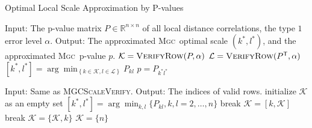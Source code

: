 \documentclass[11pt]{article}
\providecommand{\sct}[1]{{\normalfont\textsc{#1}}}
\newcommand{\Real}{\mathbb{R}}
\newcommand{\K}{\mathcal{K}}
\newcommand{\LL}{\mathcal{L}}
\newcommand{\T}{^{\ensuremath{\mathsf{T}}}}           %
\newcommand{\Mgc}{\sct{Mgc}}
\begin{document}
\begin{algorithm}
\caption{Optimal Local Scale Approximation by P-values}
\label{alg:best_scale}
\begin{algorithmic}[1]
\Statex Input: The p-value matrix $P \in \Real^{n \times n}$ of all local distance correlations, the type $1$ error level $\alpha$.
\Statex Output: The approximated \Mgc~optimal scale $(k^{*},l^{*})$, and the approximated \Mgc~p-value $p$.
\State $\K=\textsc{VerifyRow}(P,\alpha)$ 
\State $\LL=\textsc{VerifyRow}(P\T,\alpha)$ 
\State $[k^{*},l^{*}]=\arg\min_{\left\{k \in \K, l \in \LL\right\}} P_{kl}$ 
\State $p=P_{k^{*}l^{*}}$
\EndFunction
\end{algorithmic}

\begin{algorithmic}[1]
\Statex
\Statex Input: Same as \textsc{MGCScaleVerify}.
\Statex Output: The indices of valid rows.
\State initialize $\K$ as an empty set
\State $[k^{*},l^{*}]=\arg\min_{k, l} \{P_{kl},k,l=2,\ldots,n\}$
 
\State break
\EndIf
\State $\K=[k,\K]$
\EndFor
{} 
\State break
\EndIf
\State $\K=\{\K,k\}$
\EndFor
\If{$\textsc{Median}(P_{kl},k \in \K, l=2,\ldots,n) > \alpha * \frac{|\K|}{n-1}$}
\State $\K=\{n\}$ 
\EndIf
\EndFunction
\end{algorithmic}
\end{algorithm}
\end{document}
